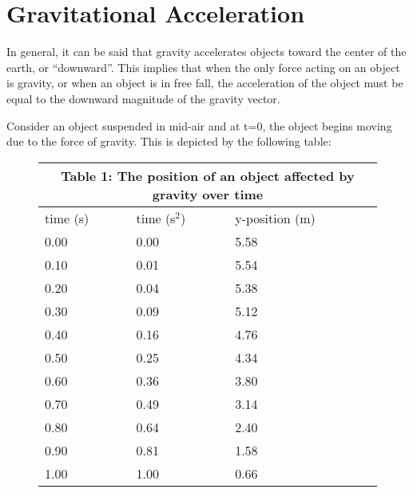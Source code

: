 \documentclass[12pt]{article}
\begin{document}
\section{Gravitational Acceleration}
In general, it can be said that gravity accelerates objects toward the center of the earth, or ``downward''. This implies that when the only force acting on an object is gravity, or when an object is in free fall, the acceleration of the object must be equal to the downward magnitude of the gravity vector.

Consider an object suspended in mid-air and at t=0, the object begins moving due to the force of gravity. This is depicted by the following table:

\setlength{\tabcolsep}{10pt}
\renewcommand{\arraystretch}{1}

\begin{figure}[H]
    \centering
    \begin{tabular}{ |p{3cm}|p{3cm}|p{3cm}| }
        \hline
        \multicolumn{3}{|c|}{Table 1: The position of an object affected by gravity over time} \\
        \hline
        time (s) & time (s$^2$) & y-position (m)                           \\
        \hline
        0.00     & 0.00         & 5.58                                     \\
        0.10     & 0.01         & 5.54                                     \\
        0.20     & 0.04         & 5.38                                     \\
        0.30     & 0.09         & 5.12                                     \\
        0.40     & 0.16         & 4.76                                     \\
        0.50     & 0.25         & 4.34                                     \\
        0.60     & 0.36         & 3.80                                     \\
        0.70     & 0.49         & 3.14                                     \\
        0.80     & 0.64         & 2.40                                     \\
        0.90     & 0.81         & 1.58                                     \\
        1.00     & 1.00         & 0.66                                     \\
        \hline
    \end{tabular}
\end{figure}
\end{document}
